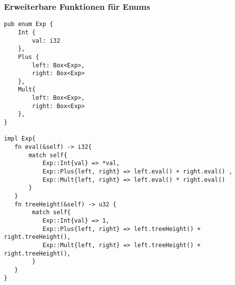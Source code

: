 \documentclass[a4paper, 1ppt]{article}
\begin{document}
\subsubsection{Erweiterbare Funktionen für Enums}
\begin{verbatim}
pub enum Exp {
    Int {
        val: i32
    },
    Plus {
        left: Box<Exp>,
        right: Box<Exp>
    },
    Mult{
        left: Box<Exp>,
        right: Box<Exp>
    },
}

impl Exp{
   fn eval(&self) -> i32{
       match self{
           Exp::Int{val} => *val,
           Exp::Plus{left, right} => left.eval() + right.eval() ,
           Exp::Mult{left, right} => left.eval() * right.eval()
       }
   }
   fn treeHeight(&self) -> u32 {
		match self{
           Exp::Int{val} => 1,
           Exp::Plus{left, right} => left.treeHeight() + right.treeHeight(),
           Exp::Mult{left, right} => left.treeHeight() + right.treeHeight(),
		} 
   }
}
\end{verbatim}
\end{document}
